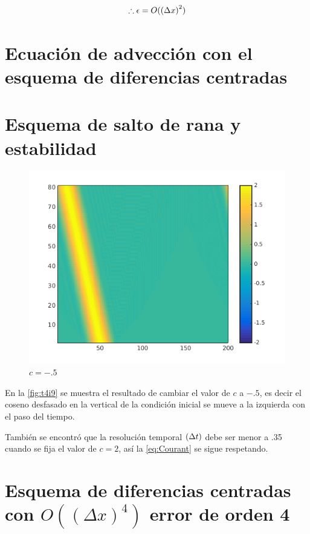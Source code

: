 \documentclass{article}
\numberwithin{figure}{section}
\numberwithin{equation}{section} %
\begin{document}
\begin{equation}
	\therefore \epsilon = O(\left( \Delta x \right)^2)
\end{equation}

\section{Ecuación de advección con el esquema de diferencias centradas}



\section{Esquema de salto de rana y estabilidad}

\begin{figure}[htp]
\centering
\includegraphics[scale=0.40]{figs/t4i9_2.png}
\caption{$c=-.5$}
\label{fig:t4i9}
\end{figure}
En la \autoref{fig:t4i9} se muestra el resultado de cambiar el valor de $c$ a $-.5$, 
es decir el coseno desfasado en la vertical de la condición inicial se mueve a la izquierda con el paso del tiempo.

También se encontró que la resolución temporal $\left( \Delta t \right)$
debe ser menor a .35 cuando se fija el valor de $c=2$,
así la \autoref{eq:Courant} se sigue respetando.

\section{Esquema de diferencias centradas con \texorpdfstring{$O\left( (\Delta x)^4 \right)$}{} error de orden 4}
\end{document}
